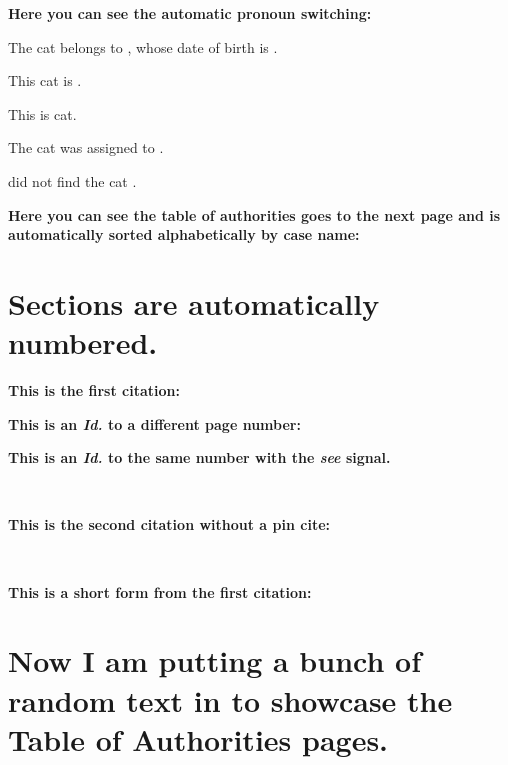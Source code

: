 \documentclass[12pt]{article}
\begin{document}
\raggedright{}


\noindent\textbf{Here you can see the automatic pronoun switching:}
\vspace{2em}

The cat belongs to \clientname{}, whose date of birth is \clientdob{}.

This cat is \theirs{}.

This is \their{} cat.

The cat was assigned to \them{}.

\They{} did not find the cat \themselves{}.
\vspace{2em}

\noindent\textbf{Here you can see the table of authorities goes to the next page and is automatically sorted alphabetically by case name:}


\clearpage
\printbibliography[keyword={case},title={\centering\normalsize\scshape{}Table of Authorities\\\small{}Cases\hfill{}Page(s)}]
\printbibliography[keyword={statute},title={\raggedright \small \scshape Statutes}]
\printbibliography[keyword={rule},title={\raggedright \small \scshape Rules}]
\clearpage

\justify
\section{Sections are automatically numbered.}

\textbf{This is the first citation:}

\cite[413]{Northland2020}

\lipsum[1]
\textbf{This is an \emph{Id.} to a different page number:}

\cite[412]{Northland2020}

\textbf{This is an \emph{Id.} to the same number with the \emph{see} signal.}

\lipsum[1]~\cite[See][412]{Northland2020}

\textbf{This is the second citation without a pin cite:}

\lipsum[1]~\cite{Gordon2000}

\textbf{This is a short form from the first citation:}

\cite[413]{Northland2020}

\section{Now I am putting a bunch of random text in to showcase the Table of Authorities pages.}
\end{document}
